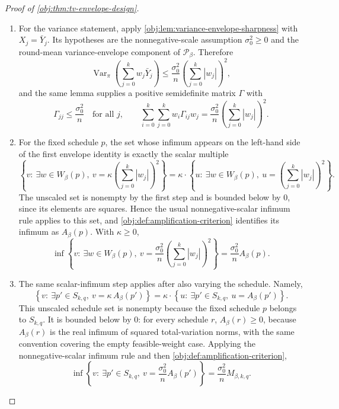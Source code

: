\documentclass[11pt]{article}
\begin{document}
\begin{proof}[Proof of \cref{obj:thm:tv-envelope-design}]
\begin{enumerate}
\item
For the variance statement, apply \cref{obj:lem:variance-envelope-sharpness} with \(X_j=\bar Y_j\). Its hypotheses are the nonnegative-scale assumption \(\sigma_0^2\ge0\) and the round-mean variance-envelope component of \(\mathcal P_\beta\). Therefore
\[
\operatorname{Var}_\pi\!\left(\sum_{j=0}^k w_j\bar Y_j\right)
\le
\frac{\sigma_0^2}{n}\left(\sum_{j=0}^k |w_j|\right)^2,
\]
and the same lemma supplies a positive semidefinite matrix \(\Gamma\) with
\[
\Gamma_{jj}\le \frac{\sigma_0^2}{n}
\quad\text{for all }j,
\qquad
\sum_{i=0}^k\sum_{j=0}^k w_i\Gamma_{ij}w_j
=
\frac{\sigma_0^2}{n}\left(\sum_{j=0}^k |w_j|\right)^2 .
\] %

\item
For the fixed schedule \(p\), the set whose infimum appears on the left-hand side of the first envelope identity is exactly the scalar multiple
\[
\left\{
v:\ \exists w\in W_\beta(p),\
v=\kappa\left(\sum_{j=0}^k |w_j|\right)^2
\right\}
=
\kappa\cdot\left\{u:\ \exists w\in W_\beta(p),\ u=\left(\sum_{j=0}^k |w_j|\right)^2\right\}.
\]
The unscaled set is nonempty by the first step and is bounded below by \(0\), since its elements are squares. Hence the usual nonnegative-scalar infimum rule applies to this set, and \cref{obj:def:amplification-criterion} identifies its infimum as \(A_\beta(p)\). With \(\kappa\ge0\),
\[
\inf\left\{
v:\ \exists w\in W_\beta(p),\
v=\frac{\sigma_0^2}{n}\left(\sum_{j=0}^k |w_j|\right)^2
\right\}
=
\frac{\sigma_0^2}{n}A_\beta(p).
\] %

\item
The same scalar-infimum step applies after also varying the schedule. Namely,
\[
\left\{
v:\ \exists p'\in S_{k,q},\
v=\kappa\,A_\beta(p')
\right\}
=
\kappa\cdot\left\{u:\ \exists p'\in S_{k,q},\ u=A_\beta(p')
\right\}.
\]
This unscaled schedule set is nonempty because the fixed schedule \(p\) belongs to \(S_{k,q}\). It is bounded below by \(0\): for every schedule \(r\), \(A_\beta(r)\ge0\), because \(A_\beta(r)\) is the real infimum of squared total-variation norms, with the same convention covering the empty feasible-weight case. Applying the nonnegative-scalar infimum rule and then \cref{obj:def:amplification-criterion},
\[
\inf\left\{
v:\ \exists p'\in S_{k,q},\
v=\frac{\sigma_0^2}{n}A_\beta(p')
\right\}
=
\frac{\sigma_0^2}{n}M_{\beta,k,q}.
\] %


\end{enumerate}
\end{proof}
\end{document}
